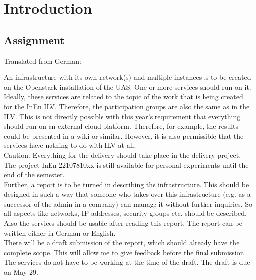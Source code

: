 \chapter{Introduction}

\section{Assignment}
Translated from German:

An infrastructure with its own network(s) and multiple instances is to be created on the Openstack installation of the UAS.
One or more services should run on it.
Ideally, these services are related to the topic of the work that is being created for the InEn ILV.
Therefore, the participation groups are also the same as in the ILV.
This is not directly possible with this year's requirement that everything should run on an external cloud platform.
Therefore, for example, the results could be presented in a wiki or similar.
However, it is also permissible that the services have nothing to do with ILV at all.\\

Caution. Everything for the delivery should take place in the delivery project.
The project InEn-22107810xx is still available for personal experiments until the end of the semester.\\

Further, a report is to be turned in describing the infrastructure.
This should be designed in such a way that someone who takes over this infrastructure (e.g. as a successor of the admin in a company) can manage it without further inquiries.
So all aspects like networks, IP addresses, security groups etc. should be described.
Also the services should be usable after reading this report.
The report can be written either in German or English.\\

There will be a draft submission of the report, which should already have the complete scope.
This will allow me to give feedback before the final submission.
The services do not have to be working at the time of the draft.
The draft is due on May 29.
